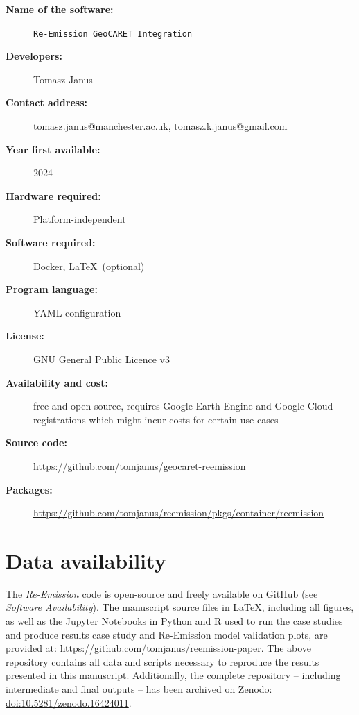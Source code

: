 \documentclass[review, authoryear, 1p]{elsarticle} %
\begin{document}
\begin{description}
  \item[\textbf{Name of the software:}] \texttt{Re-Emission GeoCARET Integration}
  \item[\textbf{Developers:}] Tomasz Janus
  \item[\textbf{Contact address:}] \href{mailto:tomasz.janus@manchester.ac.uk}{tomasz.janus@manchester.ac.uk}, \href{mailto:tomasz.k.janus@gmail.com}{tomasz.k.janus@gmail.com}
  \item[\textbf{Year first available:}] 2024
  \item[\textbf{Hardware required:}] Platform-independent
  \item[\textbf{Software required:}] Docker, \LaTeX \, (optional)
  \item[\textbf{Program language:}] YAML configuration
  \item[\textbf{License:}] GNU General Public Licence v3
  \item[\textbf{Availability and cost:}] free and open source, requires Google Earth Engine and Google Cloud registrations which might incur costs for certain use cases
  \item[\textbf{Source code:}] \href{https://github.com/tomjanus/geocaret-reemission}{https://github.com/tomjanus/geocaret-reemission}
  \item[\textbf{Packages:}] \href{https://github.com/tomjanus/reemission/pkgs/container/reemission}{https://github.com/tomjanus/reemission/pkgs/container/reemission}
\end{description}

\section{Data availability}
\label{sec:data_availability}

The \textit{Re-Emission} code is open-source and freely available on GitHub (see \emph{Software Availability}).
The manuscript source files in \LaTeX, including all figures, as well as the Jupyter Notebooks in Python and R used to run the case studies and produce results case study and Re-Emission model validation plots, are provided at: \href{https://github.com/tomjanus/reemission-paper}{https://github.com/tomjanus/reemission-paper}.
The above repository contains all data and scripts necessary to reproduce the results presented in this manuscript. 
Additionally, the complete repository -- including intermediate and final outputs -- has been archived on Zenodo: \href{https://doi.org/10.5281/zenodo.16424011}{doi:10.5281/zenodo.16424011}.
\end{document}
